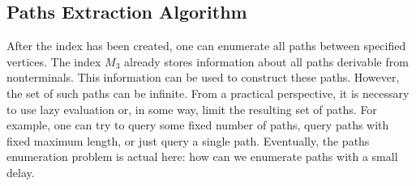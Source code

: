 \subsection{Paths Extraction Algorithm}
After the index has been created, one can enumerate all paths between specified vertices.
The index $M_3$ already stores information about all paths derivable from nonterminals. This information can be used to construct these paths. However, the set of such paths can be infinite. From a practical perspective, it is necessary to use lazy evaluation or, in some way, limit the resulting set of paths. For example, one can try to query some fixed number of paths, query paths with fixed maximum length, or just query a single path. Eventually,
the paths enumeration problem is actual here: how can we enumerate paths with a small delay.

